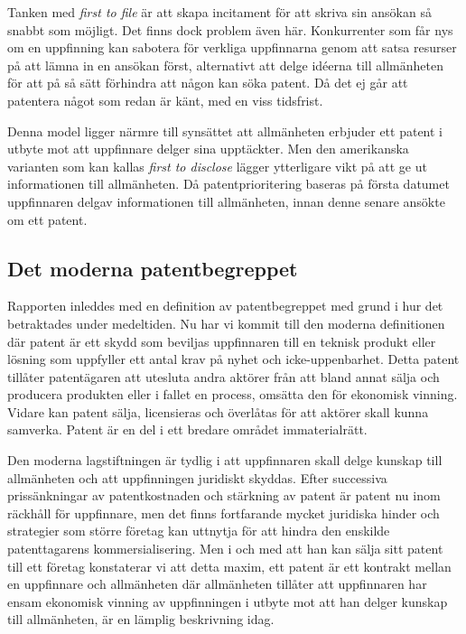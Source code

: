 Tanken med \emph{first to file} är att skapa incitament för att skriva sin ansökan så snabbt som möjligt. Det finns dock problem även här. Konkurrenter som får nys om en uppfinning kan sabotera för verkliga uppfinnarna genom att satsa resurser på att lämna in en ansökan först, alternativt att delge idéerna till allmänheten för att på så sätt förhindra att någon kan söka patent. Då det ej går att patentera något som redan är känt, med en viss tidsfrist.

Denna model ligger närmre till synsättet att allmänheten erbjuder ett patent i utbyte mot att uppfinnare delger sina upptäckter. Men den amerikanska varianten som kan kallas \emph{first to disclose} lägger ytterligare vikt på att ge ut informationen till allmänheten. Då patentprioritering baseras på första datumet uppfinnaren delgav informationen till allmänheten, innan denne senare ansökte om ett patent.


\subsection{Det moderna patentbegreppet}

Rapporten inleddes med en definition av patentbegreppet med grund i hur det betraktades under medeltiden. Nu har vi kommit till den moderna definitionen där patent är ett skydd som beviljas uppfinnaren till en teknisk produkt eller lösning som uppfyller ett antal krav på nyhet och icke-uppenbarhet. Detta patent tillåter patentägaren att utesluta andra aktörer från att bland annat sälja och producera produkten eller i fallet en process, omsätta den för ekonomisk vinning. Vidare kan patent sälja, licensieras och överlåtas för att aktörer skall kunna samverka. Patent är en del i ett bredare området immaterialrätt.

Den moderna lagstiftningen är tydlig i att uppfinnaren skall delge kunskap till allmänheten och att uppfinningen juridiskt skyddas. Efter successiva prissänkningar av patentkostnaden och stärkning av patent är patent nu inom räckhåll för uppfinnare, men det finns fortfarande mycket juridiska hinder och strategier som större företag kan uttnytja för att hindra den enskilde patenttagarens kommersialisering. Men i och med att han kan sälja sitt patent till ett företag konstaterar vi att detta maxim, ett patent är ett kontrakt mellan en
uppfinnare och allmänheten där allmänheten tillåter att uppfinnaren har ensam
ekonomisk vinning av uppfinningen i utbyte mot att han delger kunskap till
allmänheten, är en lämplig beskrivning idag.
